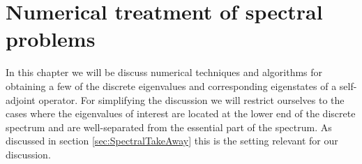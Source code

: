 \chapter{Numerical treatment of spectral problems}
\label{ch:numeigen}


In this chapter we will be discuss numerical techniques
and algorithms for obtaining a few of the discrete
eigenvalues and corresponding eigenstates
of a self-adjoint operator.
For simplifying the discussion we will restrict ourselves
to the cases where the eigenvalues of interest
are located at the lower end of the discrete spectrum
and are well-separated from the essential part of the spectrum.
As discussed in section \vref{sec:SpectralTakeAway}
this is the setting relevant for our discussion.



